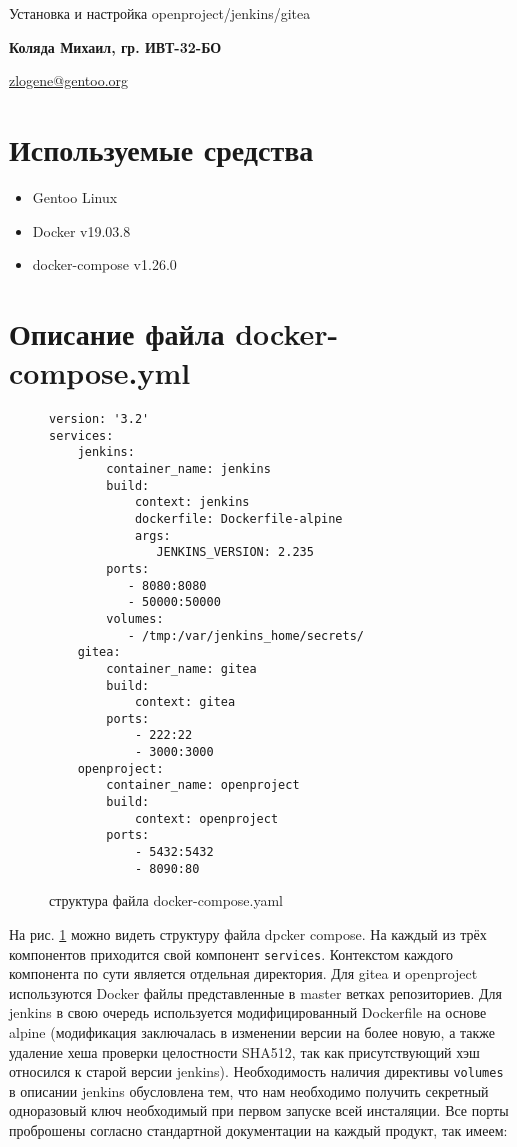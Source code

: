 \documentclass[a4paper]{extarticle}
\begin{document}
\begin{center}
        
    \vspace{0.4cm}
    \large
    Установка и настройка openproject/jenkins/gitea
        
    \vspace{0.4cm}
    \textbf{Коляда Михаил, гр. ИВТ-32-БО}
       
    \vspace{0.3cm}
    \href{mailto:zlogene@gentoo.org}{zlogene@gentoo.org}
\end{center}

\section{Используемые средства}

\begin{itemize}
\item Gentoo Linux
\item Docker v19.03.8
\item docker-compose v1.26.0
\end{itemize}

\section{Описание файла docker-compose.yml}

\begin{figure}[h!]
\begin{verbatim}
version: '3.2'
services:
    jenkins:
        container_name: jenkins
        build:
            context: jenkins
            dockerfile: Dockerfile-alpine
            args:
               JENKINS_VERSION: 2.235
        ports:
           - 8080:8080
           - 50000:50000
        volumes:
           - /tmp:/var/jenkins_home/secrets/
    gitea:
        container_name: gitea
        build:
            context: gitea
        ports:
            - 222:22
            - 3000:3000
    openproject:
        container_name: openproject
        build:
            context: openproject
        ports:
            - 5432:5432
            - 8090:80
\end{verbatim}
\caption{структура файла docker-compose.yaml}
\label{fig:dcy}
\end{figure}

На рис. \ref{fig:dcy} можно видеть структуру файла dpcker compose. На каждый из трёх компонентов приходится свой компонент \texttt{services}. Контекстом каждого компонента по сути является отдельная директория. Для gitea и openproject используются Docker файлы представленные в master ветках репозиториев. Для jenkins в свою очередь используется модифицированный Dockerfile на основе alpine (модификация заключалась в изменении версии на более новую, а также удаление хеша  проверки целостности SHA512, так как присутствующий хэш относился к старой версии jenkins). Необходимость наличия директивы \texttt{volumes} в описании jenkins обусловлена тем, что нам необходимо получить секретный одноразовый ключ необходимый при первом запуске всей	инсталяции.
Все порты проброшены согласно стандартной документации на каждый продукт, так имеем:
\end{document}
